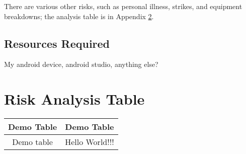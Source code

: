 \documentclass[11pt, a4paper, notitlepage]{report}
\begin{document}
There are various other risks, such as personal illness, strikes, and equipment 
breakdowns; the analysis table is in Appendix \ref{app:RiskAnalysis}.
\section{Resources Required}
My android device, android studio, anything else?

\appendix
\chapter{Risk Analysis Table}\label{app:RiskAnalysis}
\begin{tabular}{|c|c|}
	\hline
	Demo Table & Demo Table \\
	\hline
	Demo table & Hello World!!! \\
	\hline
\end{tabular}
\end{document}

